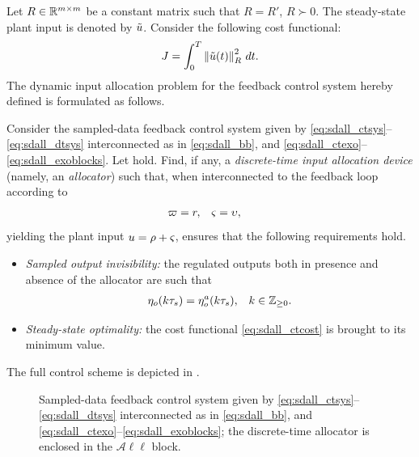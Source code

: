 Let $R\in\mathbb{R}^{m\times m}$ be a constant matrix such that $R=R'$, $R\succ 0$. The steady-state plant input is denoted by $\tilde{u}$. Consider the following cost functional:
\begin{equation}
  \label{eq:sdall_ctcost}
  J = \int_{0}^{T} \left\Vert\tilde{u}(t)\right\Vert^2_{R}\,dt.
\end{equation}
The dynamic input allocation problem for the feedback control system hereby defined is formulated as follows.
\begin{problem}
  \label{prb:sdall_all}
  Consider the sampled-data feedback control system given by \eqref{eq:sdall_ctsys}--\eqref{eq:sdall_dtsys} interconnected as in \eqref{eq:sdall_bb}, and \eqref{eq:sdall_ctexo}--\eqref{eq:sdall_exoblocks}. Let  hold. Find, if any, a \emph{discrete-time input allocation device} (namely, an \emph{allocator}) such that, when interconnected to the feedback loop according to
  \begin{align}
    \label{eq:sdall_all_interconn}
    \varpi &= r, & \varsigma &= \upsilon,
  \end{align}
  yielding the plant input $u = \rho + \varsigma$, ensures that the following requirements hold.
  \begin{itemize}
    \item[\emph{(I)}] \emph{Sampled output invisibility:} the regulated outputs both in presence and absence of the allocator are such that
      \begin{align}
        \label{eq:sdall_sdinv}
        \eta_o(k\tau_s) &= \eta_o^a(k\tau_s), & k\in\mathbb{Z}_{\geq 0}.
      \end{align}
    \item[\emph{(O)}] \emph{Steady-state optimality:} the cost functional \eqref{eq:sdall_ctcost} is brought to its minimum value.
  \end{itemize}
  \closestatement
\end{problem}
The full control scheme is depicted in .
\begin{figure}[t]
  \centering
  
  \caption{Sampled-data feedback control system given by \eqref{eq:sdall_ctsys}--\eqref{eq:sdall_dtsys} interconnected as in \eqref{eq:sdall_bb}, and \eqref{eq:sdall_ctexo}--\eqref{eq:sdall_exoblocks}; the discrete-time allocator is enclosed in the $\mathcal{A}\ell\ell$ block.}
  \label{fig:sdall_controlscheme}
\end{figure}

